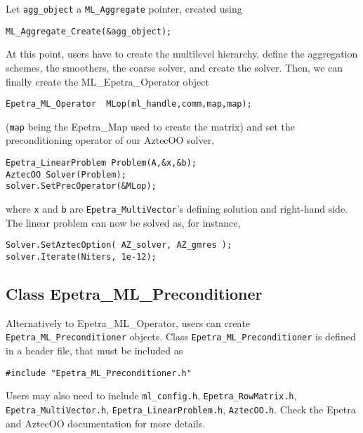 Let \verb!agg_object! a \verb!ML_Aggregate! pointer, created using
\begin{verbatim}
ML_Aggregate_Create(&agg_object);
\end{verbatim}
At this point, users have to create the multilevel hierarchy, define the
aggregation schemes, the smoothers, the coarse solver, and create the solver.
Then, we can finally create the ML\_Epetra\_Operator object
\begin{verbatim}
Epetra_ML_Operator  MLop(ml_handle,comm,map,map);
\end{verbatim}
(\verb!map! being the Epetra\_Map used to create the matrix) and set the
preconditioning operator of our AztecOO solver,
\begin{verbatim}
Epetra_LinearProblem Problem(A,&x,&b);
AztecOO Solver(Problem);
solver.SetPrecOperator(&MLop);
\end{verbatim}
where \verb!x! and \verb!b! are \verb!Epetra_MultiVector!'s defining
solution and right-hand side. The linear problem can now be solved as,
for instance,
\begin{verbatim}
Solver.SetAztecOption( AZ_solver, AZ_gmres );
solver.Iterate(Niters, 1e-12);
\end{verbatim}


\subsection{Class Epetra\_ML\_Preconditioner}
\label{ML_Preconditioner}

Alternatively to Epetra\_ML\_Operator, users can create
\verb!Epetra_ML_Preconditioner!  objects.  Class
\verb!Epetra_ML_Preconditioner! is defined in a header file, that must
be included as
\begin{verbatim}
#include "Epetra_ML_Preconditioner.h" 
\end{verbatim}
Users may also need to include \verb!ml_config.h!,
\verb!Epetra_RowMatrix.h!, \verb!Epetra_MultiVector.h!,
\verb!Epetra_LinearProblem.h!,  \verb!AztecOO.h!. Check the Epetra and
AztecOO documentation for more details.


